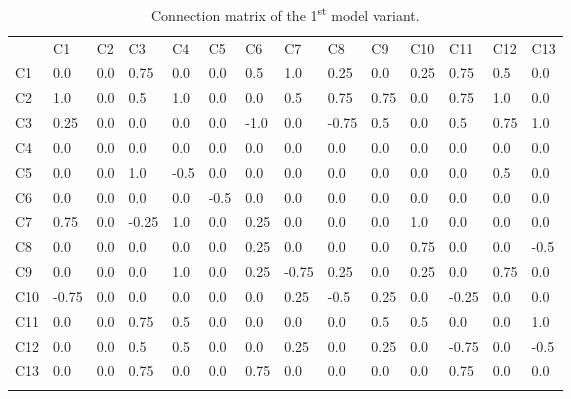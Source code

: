 \documentclass[graybox]{svmult}
\begin{document}
\begin{table}
\caption{Connection matrix of the 1\textsuperscript{st} model variant.}
\label{tab:V1connectionMtx}
\begin{center}
\begin{tabular}{l|lllllllllllll}
\hline\noalign{\smallskip}
 &      C1 &    C2 &    C3 &    C4 &    C5 &    C6 &    C7 &    C8 &    C9 &    C10 &   C11 &   C12 &   C13\\
\noalign{\smallskip}\hline\noalign{\smallskip}
C1 &    0.0 &   0.0 &   0.75 &  0.0 &   0.0 &   0.5 &   1.0 &   0.25 &  0.0 &   0.25 &  0.75 &  0.5 &   0.0\\
C2 &    1.0 &   0.0 &   0.5 &   1.0 &   0.0 &   0.0 &   0.5 &   0.75 &  0.75 &  0.0 &   0.75 &  1.0 &   0.0\\
C3 &    0.25 &  0.0 &   0.0 &   0.0 &   0.0 &   -1.0 &  0.0 &   -0.75 & 0.5 &   0.0 &   0.5 &   0.75 &  1.0\\
C4 &    0.0 &   0.0 &   0.0 &   0.0 &   0.0 &   0.0 &   0.0 &   0.0 &   0.0 &   0.0 &   0.0 &   0.0 &   0.0\\
C5 &    0.0 &   0.0 &   1.0 &   -0.5 &  0.0 &   0.0 &   0.0 &   0.0 &   0.0 &   0.0 &   0.0 &   0.5 &   0.0\\
C6 &    0.0 &   0.0 &   0.0 &   0.0 &   -0.5 &  0.0 &   0.0 &   0.0 &   0.0 &   0.0 &   0.0 &   0.0 &   0.0\\
C7 &    0.75 &  0.0 &   -0.25 & 1.0 &   0.0 &   0.25 &  0.0 &   0.0 &   0.0 &   1.0 &   0.0 &   0.0 &   0.0\\
C8 &    0.0 &   0.0 &   0.0 &   0.0 &   0.0 &   0.25 &  0.0 &   0.0 &   0.0 &   0.75 &  0.0 &   0.0 &   -0.5\\
C9 &    0.0 &   0.0 &   0.0 &   1.0 &   0.0 &   0.25 &  -0.75 & 0.25 &  0.0 &   0.25 &  0.0 &   0.75 &  0.0\\
C10 &   -0.75 & 0.0 &   0.0 &   0.0 &   0.0 &   0.0 &   0.25 &  -0.5 &  0.25 &  0.0 &   -0.25 & 0.0 &   0.0\\
C11 &   0.0 &   0.0 &   0.75 &  0.5 &   0.0 &   0.0 &   0.0 &   0.0 &   0.5 &   0.5 &   0.0 &   0.0 &   1.0\\
C12 &   0.0 &   0.0 &   0.5 &   0.5 &   0.0 &   0.0 &   0.25 &  0.0 &   0.25 &  0.0 &   -0.75 & 0.0 &   -0.5\\
C13 &   0.0 &   0.0 &   0.75 &  0.0 &   0.0 &   0.75 &  0.0 &   0.0 &   0.0 &   0.0 &   0.75 &  0.0 &   0.0\\
\noalign{\smallskip}\hline
\end{tabular}
\end{center}
\end{table}
\end{document}
